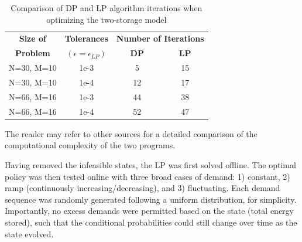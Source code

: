 \documentclass[conference]{IEEEtran}
\begin{document}
\begin{table}[htbp]
	\begin{center}
		\begin{tabular}{|c|c|c|c|}
			\hline
			\textbf{Size of}&\textbf{Tolerances}&\multicolumn{2}{|c|}{\textbf{Number of Iterations}} \\
			\cline{3-4} 
			\textbf{Problem} & \textbf{$(\epsilon=\epsilon_{LP})$} & \textbf{DP} &  \textbf{LP} \\
			\hline
			N=30, M=10& 1e-3 & 5 & 15 \\
			\hline
			N=30, M=10& 1e-4 & 12 & 17 \\
			\hline
			N=66, M=16& 1e-3 & 44 & 38 \\
			\hline
			N=66, M=16& 1e-4 & 52 & 47 \\
			\hline
		\end{tabular}
	\end{center}
	\label{tab:LPvsDP_Iterations}
	\caption{Comparison of DP and LP algorithm iterations when optimizing the two-storage model}
\end{table} The reader may refer to other sources for a detailed comparison of the computational complexity of the two programs.

Having removed the infeasible states, the LP was first solved offline. The optimal policy was then tested online with three broad cases of demand: 1) constant, 2) ramp (continuously increasing/decreasing), and 3) fluctuating. Each demand sequence was randomly generated following a uniform distribution, for simplicity. Importantly, no excess demands were permitted based on the state (total energy stored), such that the conditional probabilities could still change over time as the state evolved.
\end{document}
